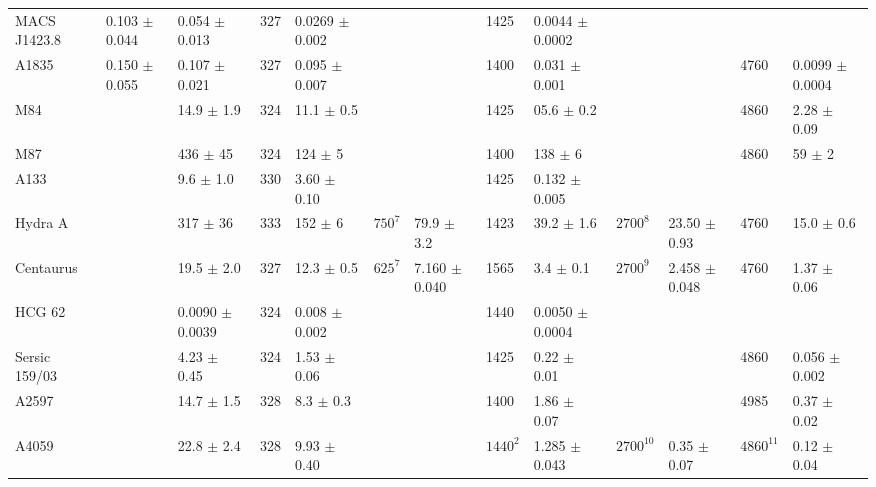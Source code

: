 \documentclass{aa}  %
\begin{document}
\begin{center}
\begin{table*}
{\begin{tabular}{l|l|l|ll|ll|ll|ll|ll}
MACS J1423.8 & 0.103   $\pm$       0.044 & 0.054   $\pm$       0.013 & 327   & 0.0269 $\pm$ 0.002 &       &       & 1425  & 0.0044 $\pm$ 0.0002 &       &       &       &  \\
A1835 & 0.150 $\pm$    0.055 & 0.107   $\pm$       0.021 & 327   & 0.095 $\pm$ 0.007 &       &       & 1400  & 0.031 $\pm$ 0.001 &       &       & 4760  & 0.0099 $\pm$ 0.0004 \\
M84   &       & 14.9   $\pm$       1.9 & 324   & 11.1 $\pm$ 0.5 &       &       & 1425  & 05.6 $\pm$ 0.2 &       &       & 4860  & 2.28 $\pm$ 0.09 \\
M87   &       & 436   $\pm$       45 & 324   & 124 $\pm$ 5 &       &       & 1400  & 138 $\pm$ 6 &       &       & 4860  & 59 $\pm$ 2 \\
A133  &       & 9.6   $\pm$       1.0 & 330   & 3.60 $\pm$ 0.10 &       &       & 1425  & 0.132 $\pm$ 0.005 &       &       &       &  \\
Hydra A &       & 317   $\pm$       36 & 333   & 152 $\pm$ 6 & $750^7$ & 79.9 $\pm$ 3.2 & 1423  & 39.2 $\pm$ 1.6 & $2700^{8}$ & 23.50 $\pm$ 0.93 & 4760  & 15.0 $\pm$ 0.6 \\
Centaurus &       & 19.5   $\pm$       2.0 & 327   & 12.3 $\pm$ 0.5 & $625^7$ & 7.160 $\pm$ 0.040 & 1565  & 3.4 $\pm$ 0.1 & $2700^{9}$ & 2.458 $\pm$ 0.048 & 4760  & 1.37 $\pm$ 0.06 \\
HCG 62 &       & 0.0090   $\pm$       0.0039 & 324   & 0.008 $\pm$ 0.002 &       &       & 1440  & 0.0050 $\pm$ 0.0004 &       &       &       &  \\
Sersic 159/03 &       & 4.23   $\pm$       0.45 & 324   & 1.53 $\pm$ 0.06 &       &       & 1425  & 0.22 $\pm$ 0.01 &       &       & 4860  & 0.056 $\pm$ 0.002 \\
A2597 &       & 14.7   $\pm$       1.5 & 328   & 8.3 $\pm$ 0.3 &       &       & 1400  & 1.86 $\pm$ 0.07 &       &       & 4985  & 0.37 $\pm$ 0.02 \\
A4059  &       & 22.8   $\pm$       2.4 & 328   & 9.93 $\pm$ 0.40 &       &       & $1440^2$ & 1.285 $\pm$ 0.043 & $2700^{10}$ & 0.35 $\pm$ 0.07 & $4860^{11}$ & 0.12 $\pm$ 0.04 \\


\hline


\end{tabular}}
\end{table*}
\end{center}
\end{document}
